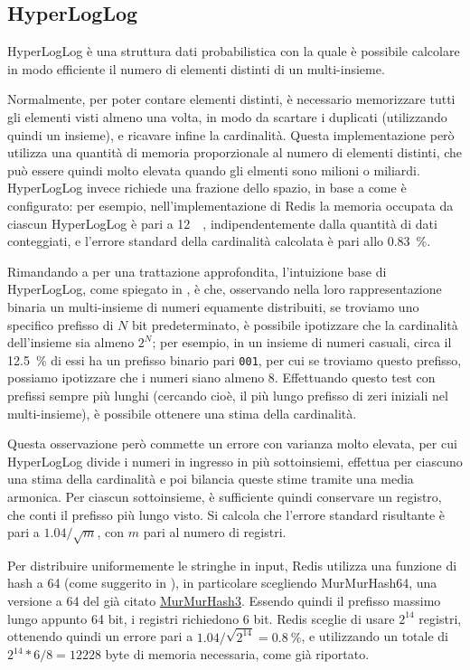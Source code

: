 \subsection{HyperLogLog}

HyperLogLog \cite{hyperloglog} è una struttura dati probabilistica con la quale è possibile
calcolare in modo efficiente il numero di elementi distinti di un multi-insieme. 

Normalmente, per poter contare elementi distinti, è necessario memorizzare tutti gli elementi visti
almeno una volta, in modo da scartare i duplicati (utilizzando quindi un insieme), e ricavare infine
la cardinalità. Questa implementazione però utilizza una quantità di memoria proporzionale al numero
di elementi distinti, che può essere quindi molto elevata quando gli elmenti sono milioni o
miliardi. HyperLogLog invece richiede una frazione dello spazio, in base a come è configurato: per
esempio, nell'implementazione di Redis la memoria occupata da ciascun HyperLogLog è pari a
\SI{12}{\kibi\byte}, indipendentemente dalla quantità di dati conteggiati, e l'errore standard della
cardinalità calcolata è pari allo \SI{0.83}{\percent}.

Rimandando a \cite{hyperloglog} per una trattazione approfondita, l'intuizione base di HyperLogLog,
come spiegato in \cite{hyperloglog-explain}, è che, osservando nella loro rappresentazione binaria
un multi-insieme di numeri equamente distribuiti, se troviamo uno specifico prefisso di $N$ bit
predeterminato, è possibile ipotizzare che la cardinalità dell'insieme sia almeno $2^N$; per
esempio, in un insieme di numeri casuali, circa il \SI{12.5}{\percent} di essi ha un prefisso
binario pari \verb|001|, per cui se troviamo questo prefisso, possiamo ipotizzare che i numeri siano
almeno \num{8}. Effettuando questo test con prefissi sempre più lunghi (cercando cioè, il più lungo
prefisso di zeri iniziali nel multi-insieme), è possibile ottenere una stima della cardinalità.

Questa osservazione però commette un errore con varianza molto elevata, per cui HyperLogLog divide i
numeri in ingresso in più sottoinsiemi, effettua per ciascuno una stima della cardinalità e poi
bilancia queste stime tramite una media armonica. Per ciascun sottoinsieme, è sufficiente quindi
conservare un registro, che conti il prefisso più lungo visto. Si calcola che l'errore standard 
risultante è pari a $1.04 / \sqrt{m}$, con $m$ pari al numero di registri. 

Per distribuire uniformemente le stringhe in input, Redis utilizza una funzione di hash a
\SI{64}{\bit} (come suggerito in \cite{hyperloglog-plusplus}), in particolare scegliendo
MurMurHash64, una versione a \SI{64}{\bit} del già citato
\href{https://github.com/aappleby/smhasher/wiki/MurmurHash3}{MurMurHash3}. Essendo quindi il
prefisso massimo lungo appunto 64 bit, i registri richiedono 6 bit. Redis sceglie di usare $2^{14}$
registri, ottenendo quindi un errore pari a $1.04 / \sqrt{2^{14}} = \SI{0.8}{\percent}$, e
utilizzando un totale di $2^{14} * 6 / 8 = \num{12228}$ byte di memoria necessaria, come già
riportato.

